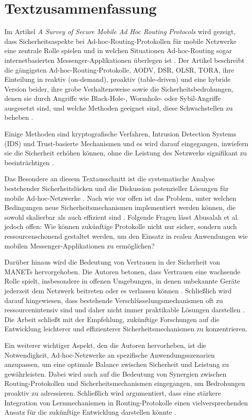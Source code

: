\chapter{Textzusammenfassung}\label{ch:intro}

Im Artikel \textit{A Survey of Secure Mobile Ad Hoc Routing Protocols} wird gezeigt, dass Sicherheitsaspekte 
bei Ad-hoc-Routing-Protokollen für mobile Netzwerke eine zentrale Rolle spielen und in welchen Situationen 
Ad-hoc-Routing sogar internetbasierten Messenger-Applikationen überlegen ist \cite[S. 1]{Li2007}.
Der Artikel beschreibt die gängigsten Ad-hoc-Routing-Protokolle, AODV, DSR, OLSR, TORA, ihre Einteilung in reaktiv (on-demand), proaktiv (table-driven)
und eine hybride Version beider, ihre grobe Verhaltensweise \cite[S. 2]{Li2007} sowie die Sicherheitsbedrohungen, 
denen sie durch Angriffe wie Black-Hole-, Wormhole- oder Sybil-Angriffe ausgesetzt sind, und welche Methoden geeignet sind, diese Schwachstellen zu 
beheben \cite[S. 4-11]{Li2007}.

Einige Methoden sind kryptografische Verfahren, Intrusion Detection Systems (IDS) und Trust-basierte Mechanismen und 
es wird darauf eingegangen, inwiefern sie die Sicherheit erhöhen können, ohne die Leistung 
des Netzwerks signifikant zu beeinträchtigen \cite[S. 7]{Li2007}. 

Das Besondere an diesem Textausschnitt ist die systematische Analyse bestehender Sicherheitslücken und die 
Diskussion potenzieller Lösungen für mobile Ad-hoc-Netzwerke \cite[S. 9]{Li2007}. Nach wie vor offen ist das 
Problem, unter welchen Bedingungen neue Sicherheitsmechanismen implementiert werden können, die sowohl skalierbar 
als auch effizient sind \cite[S. 12]{Li2007}. Folgende Fragen lässt Abusalah et al. jedoch offen: Wie können 
zukünftige Protokolle nicht nur sicher, sondern auch ressourcenschonend gestaltet werden, um den Einsatz in realen 
Anwendungen wie mobilen Messenger-Applikationen zu ermöglichen?

Darüber hinaus wird die Bedeutung von Vertrauen in der Sicherheit von MANETs hervorgehoben. 
Die Autoren betonen, dass Vertrauen eine wachsende Rolle spielt, insbesondere in offenen Umgebungen, 
in denen unbekannte Geräte jederzeit dem Netzwerk beitreten oder es verlassen können \cite[S. 13]{Li2007}. 
Schließlich wird darauf hingewiesen, dass bestehende Verschlüsselungsmechanismen oft zu ressourcenintensiv 
sind und daher nicht immer praktikable Lösungen darstellen \cite[S. 14]{Li2007}. Die Arbeit schließt mit der 
Empfehlung, zukünftige Forschungen auf die Entwicklung leichterer und effizienterer Sicherheitsmechanismen zu 
konzentrieren. 

Ein weiterer wichtiger Aspekt, den die Autoren hervorheben, ist die Notwendigkeit, Ad-hoc-Netzwerke an spezifische 
Anwendungsszenarien anzupassen, um eine optimale Balance zwischen Sicherheit und Leistung zu gewährleisten. 
Dabei wird auch auf die Bedeutung von Synergien zwischen Routing-Protokollen und Sicherheitsmechanismen eingegangen, 
um Bedrohungen proaktiv zu adressieren. Schließlich wird argumentiert, dass eine stärkere Integration von 
Lernmechanismen in Routing-Protokolle einen vielversprechenden Ansatz für die zukünftige Entwicklung darstellen könnte 
\cite[S. 15]{Li2007}.
